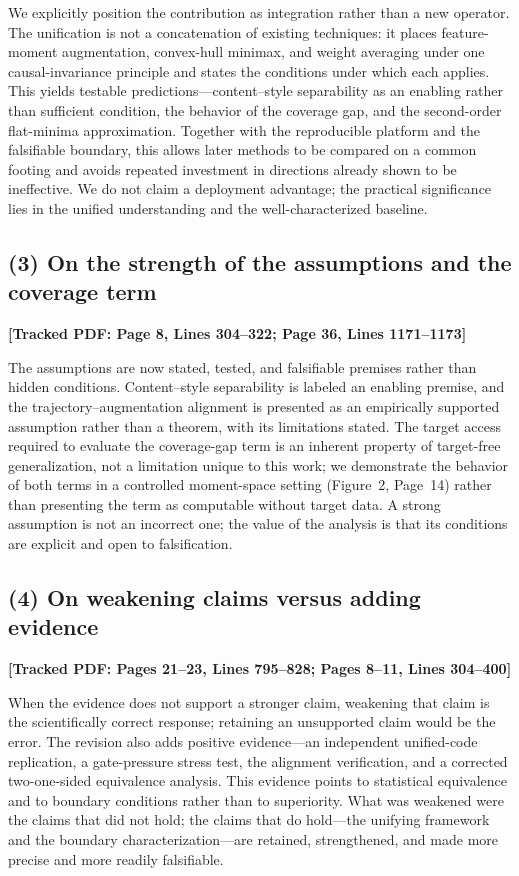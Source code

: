 \documentclass[11pt]{article}
\newcommand{\loc}[1]{\textbf{[\textcolor{revblue}{Tracked PDF: #1}]}}
\begin{document}
We explicitly position the contribution as integration rather than a new
operator. The unification is not a concatenation of existing techniques: it
places feature-moment augmentation, convex-hull minimax, and weight averaging
under one causal-invariance principle and states the conditions under which
each applies. This yields testable predictions---content--style separability
as an enabling rather than sufficient condition, the behavior of the coverage
gap, and the second-order flat-minima approximation. Together with the
reproducible platform and the falsifiable boundary, this allows later methods
to be compared on a common footing and avoids repeated investment in
directions already shown to be ineffective. We do not claim a deployment
advantage; the practical significance lies in the unified understanding and
the well-characterized baseline.

\subsection*{(3) On the strength of the assumptions and the coverage term}
\loc{Page 8, Lines 304--322; Page 36, Lines 1171--1173}

The assumptions are now stated, tested, and falsifiable premises rather than
hidden conditions. Content--style separability is labeled an enabling premise,
and the trajectory--augmentation alignment is presented as an empirically
supported assumption rather than a theorem, with its limitations stated. The
target access required to evaluate the coverage-gap term is an inherent
property of target-free generalization, not a limitation unique to this work;
we demonstrate the behavior of both terms in a controlled moment-space setting
(Figure~2, Page~14) rather than presenting the term as computable without
target data. A strong assumption is not an incorrect one; the value of the
analysis is that its conditions are explicit and open to falsification.

\subsection*{(4) On weakening claims versus adding evidence}
\loc{Pages 21--23, Lines 795--828; Pages 8--11, Lines 304--400}

When the evidence does not support a stronger claim, weakening that claim is
the scientifically correct response; retaining an unsupported claim would be
the error. The revision also adds positive evidence---an independent
unified-code replication, a gate-pressure stress test, the alignment
verification, and a corrected two-one-sided equivalence analysis. This
evidence points to statistical equivalence and to boundary conditions rather
than to superiority. What was weakened were the claims that did not hold; the
claims that do hold---the unifying framework and the boundary
characterization---are retained, strengthened, and made more precise and more
readily falsifiable.
\end{document}
